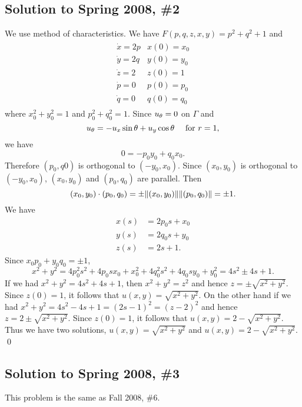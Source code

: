 \subsection*{Solution to Spring 2008, \#2}\label{s082}
We use method of characteristics. We have $F(p, q, z, x, y) = p^{2} + q^{2} + 1$ and
\begin{align*}
\begin{array}{ll}
\dot{x} = 2p & x(0) = x_{0}\\
\dot{y} = 2q & y(0) = y_{0}\\
\dot{z} = 2 & z(0) = 1\\
\dot{p} = 0 & p(0) = p_{0}\\
\dot{q} = 0 & q(0) = q_{0}
\end{array}
\end{align*}
where $x_{0}^{2} + y_{0}^{2} = 1$ and $p_{0}^{2} + q_{0}^{2} = 1$.
Since $u_{\theta} = 0$ on $\Gamma$ and
$$u_{\theta} = -u_{x}\sin\theta + u_{y}\cos\theta \quad \text{ for $r = 1$},$$
we have
$$0 = -p_{0}y_{0} + q_{0}x_{0}.$$
Therefore $(p_{0}, q{0})$ is orthogonal to $(-y_{0}, x_{0})$. Since $(x_{0}, y_{0})$
is orthogonal to $(-y_{0}, x_{0})$, $(x_{0}, y_{0})$ and $(p_{0}, q_{0})$ are parallel.
Then $$(x_{0}, y_{0}) \cdot (p_{0}, q_{0}) = \pm\| (x_{0}, y_{0}) \|\| (p_{0}, q_{0}) \| = \pm 1.$$
We have
\begin{align*}
x(s) &= 2p_{0}s + x_{0}\\
y(s) &= 2q_{0}s + y_{0}\\
z(s) &= 2s + 1.
\end{align*}
Since $x_{0}p_{0} + y_{0}q_{0} = \pm 1$,
$$x^{2} + y^{2} = 4p_{0}^{2}s^{2} + 4p_{0}sx_{0} + x_{0}^{2} + 4q_{0}^{2}s^{2} + 4q_{0}sy_{0} + y_{0}^{2} = 4s^{2} \pm 4s + 1.$$
If we had $x^{2} + y^{2} = 4s^{2} + 4s + 1$, then $x^{2} + y^{2} = z^{2}$ and hence
$z = \pm \sqrt{x^{2} + y^{2}}$. Since $z(0) = 1$, it follows that $u(x, y) = \sqrt{x^{2} + y^{2}}$.
On the other hand if we had $x^{2} + y^{2} = 4s^{2} - 4s + 1 = (2s - 1)^{2} = (z - 2)^{2}$
and hence $z = 2 \pm \sqrt{x^{2} + y^{2}}$. Since $z(0) = 1$, it follows that $u(x, y) = 2 - \sqrt{x^{2} + y^{2}}$.
Thus we have two solutions, $u(x, y) = \sqrt{x^{2} + y^{2}}$ and $u(x, y) = 2 - \sqrt{x^{2} + y^{2}}$.
\hfill\qed

\subsection*{Solution to Spring 2008, \#3}\label{s083}
This problem is the same as Fall 2008, \#6.

\vspace{0.4cm}

